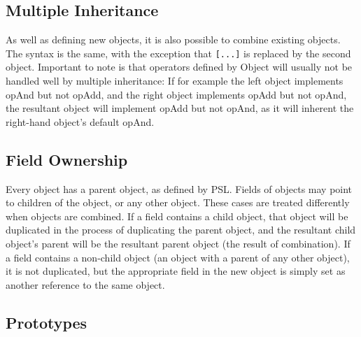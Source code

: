 \subsection{Multiple Inheritance}

As well as defining new objects, it is also possible to combine existing objects. The syntax is the same, with the exception that \texttt{[...]} is replaced by the second object. Important to note is that operators defined by Object will usually not be handled well by multiple inheritance: If for example the left object implements opAnd but not opAdd, and the right object implements opAdd but not opAnd, the resultant object will implement opAdd but not opAnd, as it will inherent the right-hand object's default opAnd.



\subsection{Field Ownership}

Every object has a parent object, as defined by PSL. Fields of objects may point to children of the object, or any other object. These cases are treated differently when objects are combined. If a field contains a child object, that object will be duplicated in the process of duplicating the parent object, and the resultant child object's parent will be the resultant parent object (the result of combination). If a field contains a non-child object (an object with a parent of any other object), it is not duplicated, but the appropriate field in the new object is simply set as another reference to the same object.



\subsection{Prototypes}

